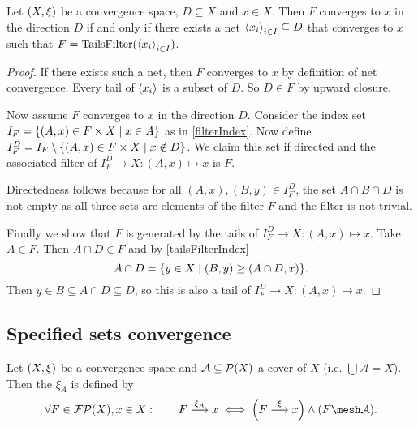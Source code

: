 \begin{lemma}
Let $\left( X,\xi \right)$ be a convergence space, $D\subseteq X$ and $x\in X$. Then $F$ converges to $x$ in the direction $D$ \textup{if and only if} there exists a net $\left\langle x_i \right\rangle_{i\in I}\subseteq D$ that converges to $x$ such that $F = \operatorname{TailsFilter}(\left\langle x_i \right\rangle_{i\in I})$.
\end{lemma}
\begin{proof}
If there exists such a net, then $F$ converges to $x$ by definition of net convergence. Every tail of $\left\langle x_i \right\rangle$ is a subset of $D$. So $D\in F$ by upward closure.

Now assume $F$ converges to $x$ in the direction $D$. Consider the index set $I_F = \setbuilder{(A,x)\in F\times X}{x\in A}$ as in \ref{filterIndex}. Now define $I_F^D = I_F\setminus\setbuilder{(A,x)\in F\times X}{x\notin D}$. We claim this set if directed and the associated filter of $I_F^D \to X: (A,x) \mapsto x$ is $F$.

Directedness follows because for all $(A,x), (B,y)\in I_F^D$, the set $A\cap B\cap D$ is not empty as all three sets are elements of the filter $F$ and the filter is not trivial.

Finally we show that $F$ is generated by the tails of $I_F^D \to X: (A,x) \mapsto x$. Take $A\in F$. Then $A\cap D\in F$ and by \ref{tailsFilterIndex}
\[ A\cap D = \setbuilder{y\in X}{(B,y) \geq (A\cap D,x)}. \]
Then $y\in B\subseteq A\cap D \subseteq D$, so this is also a tail of $I_F^D \to X: (A,x) \mapsto x$.
\end{proof}

\subsection{Specified sets convergence}
\begin{definition}
Let $\left( X,\xi \right)$ be a convergence space and $\mathcal{A}\subseteq \operatorname{\mathcal{P}}(X)$ a cover of $X$ (i.e. $\bigcup \mathcal{A} = X$). Then the  $\xi_A$ is defined by
\[ \forall F\in\powerfilters(X), x\in X: \qquad F\overset{\xi_A}{\longrightarrow} x \iff \Big(F \overset{\xi}{\longrightarrow} x\Big) \land (F \mesh \mathcal{A}). \]
\end{definition}

